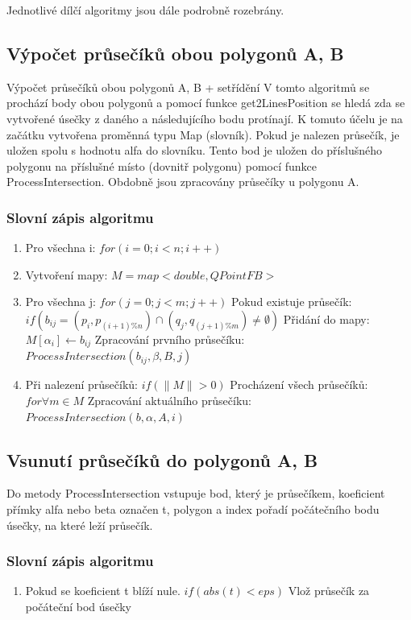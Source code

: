 \documentclass[a4paper,11pt,twoside]{article}
\begin{document}
\noindent Jednotlivé dílčí algoritmy jsou dále podrobně rozebrány.

\newpage
\vspace*{-1cm}
\subsection{Výpočet průsečíků obou polygonů A, B}
\noindent Výpočet průsečíků obou polygonů A, B + setřídění
V tomto algoritmů se prochází body obou polygonů a pomocí funkce get2LinesPosition se hledá zda se vytvořené úsečky z daného a následujícího bodu protínají. K tomuto účelu je na začátku vytvořena proměnná typu Map (slovník). Pokud je nalezen průsečík, je uložen spolu s hodnotu alfa do slovníku. Tento bod je uložen do příslušného polygonu na příslušné místo (dovnitř polygonu) pomocí funkce  ProcessIntersection. Obdobně jsou zpracovány průsečíky u polygonu A.

\subsubsection{Slovní zápis algoritmu}
\begin{enumerate}
\item Pro všechna i: $for (i = 0; i < n; i++)$
\item Vytvoření mapy: $ M = map<double, QPointFB>$
\item Pro všechna j: $for (j = 0; j < m; j++)$
\subitem Pokud existuje průsečík: $if (b_{ij} = (p_i, p_{(i+1)\%n}) \cap (q_j, q_{(j+1)\%m})  \neq \emptyset  )$
\subitem Přidání do mapy: $M[\alpha_i] \leftarrow b_{ij}$
\subitem Zpracování prvního průsečíku: $ProcessIntersection (b_{ij}, \beta, B, j)$
\item Při nalezení průsečíků: $if (\| M \| > 0) $
\subitem Procházení všech průsečíků: $for \forall m \in M$
\subitem Zpracování aktuálního průsečíku: $ProcessIntersection(b, \alpha, A, i)$
\end{enumerate}

\subsection{Vsunutí průsečíků do polygonů A, B}
Do metody ProcessIntersection vstupuje bod, který je průsečíkem, koeficient přímky alfa nebo beta označen t, polygon a index pořadí počátečního bodu úsečky, na které leží průsečík.

\subsubsection{Slovní zápis algoritmu}
\begin{enumerate}
\item Pokud se koeficient t blíží nule. $ if( abs(t) < eps )$
\subitem Vlož průsečík za počáteční bod úsečky
\end{enumerate}
\end{document}
